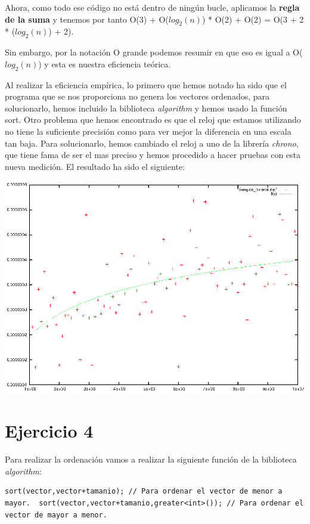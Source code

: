 \documentclass[11pt]{article}
\begin{document}
Ahora, como todo ese código no está dentro de ningún bucle, aplicamos
la \textbf{regla de la suma} y tenemos por tanto O(3) + O($log_2 (n)$) *
O(2) + O(2) = O(3 + 2 * ($log_2 (n)$) + 2).

Sin embargo, por la notación O grande podemos resumir en que eso es
igual a O($log_2(n)$) y esta es nuestra eficiencia teórica.

Al realizar la eficiencia empírica, lo primero que hemos notado ha
sido que el programa que se nos proporciona no genera los vectores
ordenados, para solucionarlo, hemos incluido la biblioteca \emph{algorithm}
y hemos usado la función sort.  Otro problema que hemos encontrado es
que el reloj que estamos utilizando no tiene la suficiente precisión
como para ver mejor la diferencia en una escala tan baja. Para
solucionarlo, hemos cambiado el reloj a uno de la librería \emph{chrono},
que tiene fama de ser el mas preciso y hemos procedido a hacer pruebas
con esta nueva medición.  El resultado ha sido el siguiente:

\includegraphics[scale=1]{grafica_binaria_otro.eps}

\section*{Ejercicio 4}
\label{sec-4}

Para realizar la ordenación vamos a realizar la siguiente función de
la biblioteca \emph{algorithm}:

\begin{verbatim}
sort(vector,vector+tamanio); // Para ordenar el vector de menor a
mayor.  sort(vector,vector+tamanio,greater<int>()); // Para ordenar el
vector de mayor a menor.
\end{verbatim}
\end{document}

